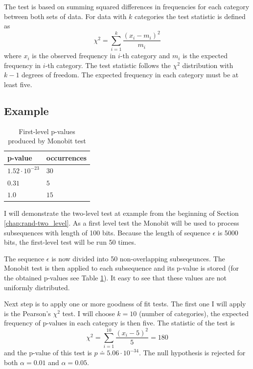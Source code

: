 \documentclass[
  digital,     %
  oneside,     %
  nosansbold,  %
  nocolorbold, %
  nolof,         %
  nolot,         %
]{fithesis4}
\begin{document}
The test is based on summing squared differences in frequencies for each category between both sets of data. For data with $k$ categories the test statistic is defined as \[\chi^2 = \sum_{i=1}^{k} \dfrac{(x_i - m_i)^2}{m_i} \]
where $x_i$ is the observed frequency in $i$-th category and $m_i$ is the expected frequency in $i$-th category. The test statistic follows the $\chi^2$ distribution with $k-1$ degrees of freedom. The expected frequency in each category must be at least five. \cite[p. 171]{stat-procedures}
 
\subsection{Example}
\begin{table}
  \begin{tabularx}{0.4\textwidth}{ll}
    \toprule
    p-value & occurrences  \\
    \midrule
    $1.52 \cdot 10^{-23}$ & $30$\\
    $0.31$ & $5$\\
    $1.0$ & $15$\\
    \bottomrule
  \end{tabularx}
  \caption{First-level p-values produced by Monobit test}
  \label{tab:first_pvalues}
\end{table}



I will demonstrate the two-level test at example from the beginning of Section \ref{chap:rand-two_level}. As a first level test the Monobit \cite[p. 2-2]{nist_special} will be used to process subsequences with length of 100 bits. Because the length of sequence $\epsilon$ is 5000 bits, the first-level test will be run 50 times.

The sequence $\epsilon$ is now divided into 50 non-overlapping subseqeunces. The Monobit test is then applied to each subsequence  and its p-value is stored (for the obtained p-values see Table \ref{tab:first_pvalues}). It easy to see that these values are not uniformly distributed.

Next step is to apply one or more goodness of fit tests. The first one I will apply is the Pearson's $\chi^2$ test. I will choose $k=10$ (number of categories), the expected frequency of p-values in each category is then five. The statistic of the test is
\[\chi^2 = \sum_{i=1}^{10} \dfrac{(x_i - 5)^2}{5} = 180 \]
and the p-value of this test is $p\doteq5.06\cdot10^{-34}$. The null hypothesis is rejected for both $\alpha = 0.01$ and $\alpha = 0.05$. 
\end{document}
